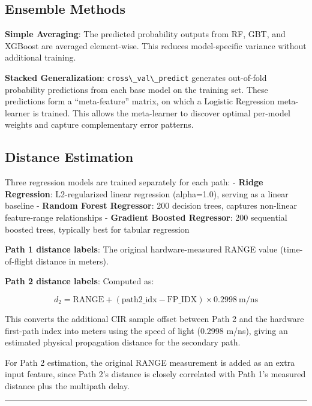 \documentclass[12pt,a4paper]{article}
\newcommand{\passthrough}[1]{#1}
\providecommand{\passthrough}[1]{#1}
\begin{document}
\subsection{Ensemble Methods}\label{ensemble-methods}

\textbf{Simple Averaging}: The predicted probability outputs from RF,
GBT, and XGBoost are averaged element-wise. This reduces model-specific
variance without additional training.

\textbf{Stacked Generalization}:
\passthrough{\lstinline!cross\_val\_predict!} generates out-of-fold
probability predictions from each base model on the training set. These
predictions form a ``meta-feature'' matrix, on which a Logistic
Regression meta-learner is trained. This allows the meta-learner to
discover optimal per-model weights and capture complementary error
patterns.

\subsection{Distance Estimation}\label{distance-estimation}

Three regression models are trained separately for each path: -
\textbf{Ridge Regression}: L2-regularized linear regression (alpha=1.0),
serving as a linear baseline - \textbf{Random Forest Regressor}: 200
decision trees, captures non-linear feature-range relationships -
\textbf{Gradient Boosted Regressor}: 200 sequential boosted trees,
typically best for tabular regression

\textbf{Path 1 distance labels}: The original hardware-measured RANGE
value (time-of-flight distance in meters).

\textbf{Path 2 distance labels}: Computed as:

\[d_2 = \mathrm{RANGE} + (\mathrm{path2\_idx} - \mathrm{FP\_IDX}) \times 0.2998 \ \mathrm{m/ns}\]

This converts the additional CIR sample offset between Path 2 and the
hardware first-path index into meters using the speed of light (0.2998
m/ns), giving an estimated physical propagation distance for the
secondary path.

For Path 2 estimation, the original RANGE measurement is added as an
extra input feature, since Path 2's distance is closely correlated with
Path 1's measured distance plus the multipath delay.

\begin{center}\rule{0.5\linewidth}{0.5pt}\end{center}
\end{document}
